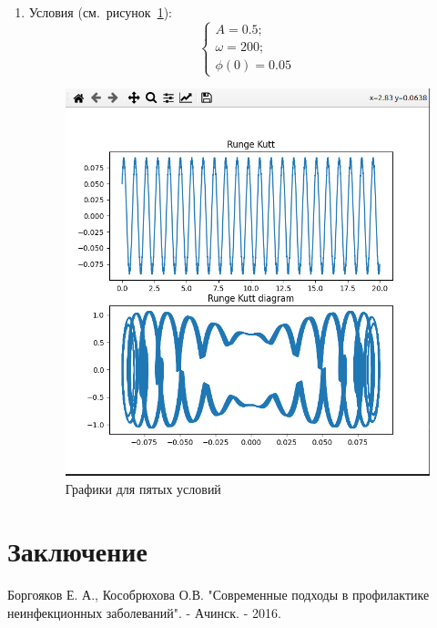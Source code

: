 \documentclass[a4paper,12pt]{article}
\begin{document}
\begin{enumerate}
		\item Условия (см.~рисунок~\ref{fig:5_praq}):
		\begin{equation}
			\begin{cases}
				A = 0.5; \\
				\omega = 200; \\
				\phi(0) = 0.05
			\end{cases}
		\end{equation}
		\begin{figure}[ht!]
			\begin{center}
			\includegraphics[scale=0.3]{sources/5_praq.png}
			\end{center}
			\vspace*{-8mm}
			\caption{Графики для пятых условий}\label{fig:5_praq}
	  	\end{figure}

	\end{enumerate}


	\newpage
	
	\section{Заключение}

	\begin{thebibliography}{w:40}
		
		 Боргояков Е. А., Кособрюхова О.В. "Современные подходы в профилактике неинфекционных заболеваний". - Ачинск. - 2016.
		
	\end{thebibliography}
	
	
\end{document}
